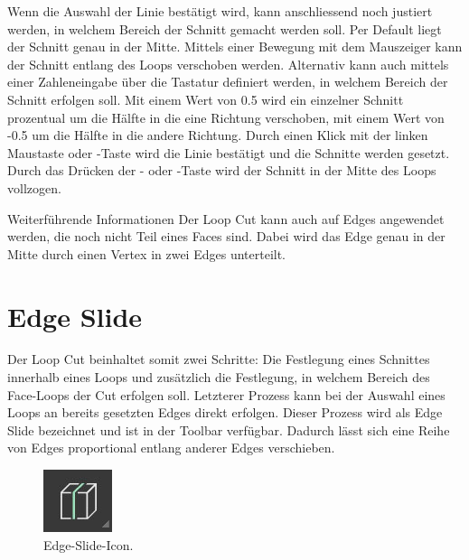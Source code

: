 \documentclass[
]{book}
\let\oldmarginnote\marginnote
\renewcommand{\marginnote}[1]{%
  \oldmarginnote{{\footnotesize\selectfont #1}}%
}
\newcommand{\kbd}[1]{\fbox{\texttt{#1}}}
\begin{document}
Wenn die Auswahl der Linie bestätigt wird, kann anschliessend noch
justiert werden, in welchem Bereich der Schnitt gemacht werden soll. Per
Default liegt der Schnitt genau in der Mitte. Mittels einer Bewegung mit
dem Mauszeiger kann der Schnitt entlang des Loops verschoben werden.
Alternativ kann auch mittels einer Zahleneingabe über die Tastatur
definiert werden, in welchem Bereich der Schnitt erfolgen soll. Mit
einem Wert von 0.5 wird ein einzelner Schnitt prozentual um die Hälfte
in die eine Richtung verschoben, mit einem Wert von -0.5 um die Hälfte
in die andere Richtung. Durch einen Klick mit der linken Maustaste oder
\kbd{Enter}-Taste wird die Linie bestätigt und die Schnitte werden
gesetzt. Durch das Drücken der \kbd{Delete}- oder \kbd{esc}-Taste wird
der Schnitt in der Mitte des Loops vollzogen.

\begin{tipp}{Weiterführende Informationen}
Der Loop Cut kann auch auf Edges angewendet werden, die noch nicht Teil eines Faces sind. Dabei wird das Edge genau in der Mitte durch einen Vertex in zwei Edges unterteilt.
\end{tipp}

\section{Edge Slide}\label{edge-slide}

\marginnote{Edge Slide}

Der Loop Cut beinhaltet somit zwei Schritte: Die Festlegung eines
Schnittes innerhalb eines Loops und zusätzlich die Festlegung, in
welchem Bereich des Face-Loops der Cut erfolgen soll. Letzterer Prozess
kann bei der Auswahl eines Loops an bereits gesetzten Edges direkt
erfolgen. Dieser Prozess wird als Edge Slide bezeichnet und ist in der
Toolbar verfügbar. Dadurch lässt sich eine Reihe von Edges proportional
entlang anderer Edges verschieben.

\begin{figure}

\includegraphics{Chapters/Images/Chapter_11/11_3_Icon_LoopCut.png}

\caption{\label{fig-1_4}Edge-Slide-Icon.}

\end{figure}%
\end{document}

